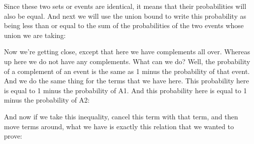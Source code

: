 \documentclass[pdftex, brazil, 12pt, twoside]{article}
\begin{document}
Since these two sets or events are identical, it means that
their probabilities will also be equal.
And next we will use the union bound to write this
probability as being less than or equal to the sum of the
probabilities of the two events whose
union we are taking:

\begin{figure}[H]
  \begin{center}
  \end{center}
\end{figure}

Now we're getting close, except that here we have
complements all over.
Whereas up here we do not have any complements.
What can we do?
Well, the probability of a complement of an event is the
same as 1 minus the probability of that event.
And we do the same thing for the terms that we have here.
This probability here is equal to 1 minus the
probability of A1.
And this probability here is equal to 1 minus the
probability of A2:

\begin{figure}[H]
  \begin{center}
  \end{center}
\end{figure}

And now if we take this inequality, cancel this term
with that term, and then move terms around, what we have is
exactly this relation that we wanted to prove:

\begin{figure}[H]
  \begin{center}
  \end{center}
\end{figure}
\end{document}
